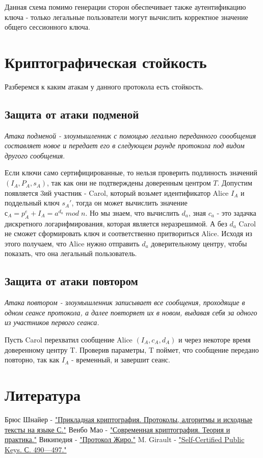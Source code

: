 \documentclass[a4paper]{article}
\begin{document}
Данная схема помимо генерации сторон обеспечивает также аутентификацию ключа - только легальные пользователи могут вычислить корректное значение общего сессионного ключа.

\section{Криптографическая стойкость}
Разберемся к каким атакам у данного протокола есть стойкость.
\subsection{Защита от атаки подменой}
\textit{Атака подменой - злоумышленник с помощью легально переданного соообщения составляет новое и передает его в следующем раунде протокола под видом другого сообщения}.
\\
\par 
Если ключи само сертифицированные, то нельзя проверить подлиность значений $(I_A, P_A, s_A)$, так как они не подтверждены доверенным центром $T$.
Допустим появляется 3ий участник - Carol, который возьмет идентификатор Alice $I_A$ и поддельный ключ $s_A'$, тогда он может вычислить значение $с_A = p_A^e + I_A = a^{d_a} \; mod \; n$. Но мы знаем, что вычислить $d_a$, зная $c_a$ -  это задачка дискретного логарифмирования, которая является неразрешимой.
А без $d_a$ Carol не сможет сформировать ключ и соответственно притвориться Alice. Исходя из этого получаем, что Alice нужно отправить $d_a$ доверительному центру, чтобы показать, что она легальный пользователь.
\subsection{Защита от атаки повтором}

\textit{Атака повтором - злоумышленник записывает все сообщения, проходящие в одном сеансе протокола, а далее повторяет их в новом, выдавая себя за одного из участников первого сеанса.}
\\
\par Пусть Carol перехватил сообщение Alice $(I_A, c_A, d_A)$ и через некоторе время доверенному центру T. Проверив параметры, T поймет, что сообщение передано повторно, так как $I_A$ - временный, и завершит сеанс. 
\section{Литература}

\begin{thebibliography}{}
      Брюс Шнайер -  \href{https://lib.mipt.ru/book/n/00013022000cdbe8096da0a688d3a130/Shnaier-B-Prikladnaya-kriptografiya-Protokoly-algoritmy-i-ishodnye-teksty-na-yazyke-S.pdf}{"Прикладная криптография. Протоколы, алгоритмы и исходные тексты на языке С."}
      Венбо Мао -  \href{https://lib.mipt.ru/book/266371/?q=+криптографические+протоколы}{"Современная криптография. Теория и практика."}
      Википедия -  \href{https://ru.wikipedia.org/wiki/Протокол_Жиро}{"Протокол Жиро."}
      M. Girault -  \href{https://doi.org/10.1007/3-540-46416-6_42}{"Self-Certified Public Keys. С. 490—497."}
\end{thebibliography}
\end{document}
